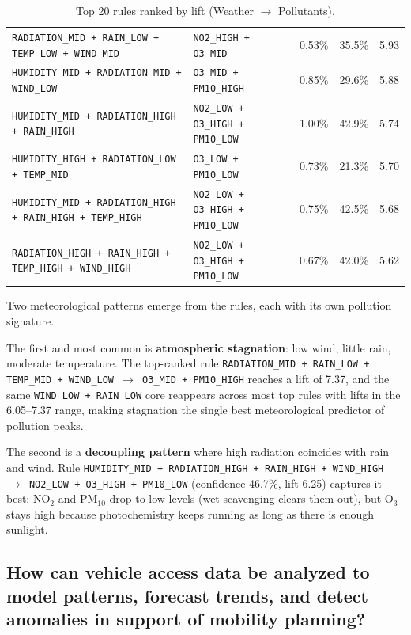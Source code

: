 \documentclass{article}
\begin{document}
\begin{table}[H]
{\begin{tabular}{llrrr}
			\texttt{RADIATION\_MID + RAIN\_LOW + TEMP\_LOW + WIND\_MID}& \texttt{NO2\_HIGH + O3\_MID}& 0.53\% & 35.5\% & 5.93 \\
			\texttt{HUMIDITY\_MID + RADIATION\_MID + WIND\_LOW}& \texttt{O3\_MID + PM10\_HIGH} & 0.85\% & 29.6\% & 5.88 \\
			\texttt{HUMIDITY\_MID + RADIATION\_HIGH + RAIN\_HIGH}& \texttt{NO2\_LOW + O3\_HIGH + PM10\_LOW}& 1.00\% & 42.9\% & 5.74 \\
			\texttt{HUMIDITY\_HIGH + RADIATION\_LOW + TEMP\_MID} & \texttt{O3\_LOW + PM10\_LOW}& 0.73\% & 21.3\% & 5.70 \\
			\texttt{HUMIDITY\_MID + RADIATION\_HIGH + RAIN\_HIGH + TEMP\_HIGH} & \texttt{NO2\_LOW + O3\_HIGH + PM10\_LOW}& 0.75\% & 42.5\% & 5.68 \\
			\texttt{RADIATION\_HIGH + RAIN\_HIGH + TEMP\_HIGH + WIND\_HIGH}& \texttt{NO2\_LOW + O3\_HIGH + PM10\_LOW}& 0.67\% & 42.0\% & 5.62 \\
			\hline
		\end{tabular}}
		\caption*{Top 20 rules ranked by lift (Weather $\rightarrow$ Pollutants).}
	\end{table}

	Two meteorological patterns emerge from the rules, each with its own pollution signature.

	The first and most common is \textbf{atmospheric stagnation}: low wind, little rain, moderate temperature. The top-ranked rule \texttt{RADIATION\_MID + RAIN\_LOW + TEMP\_MID + WIND\_LOW $\rightarrow$ O3\_MID + PM10\_HIGH} reaches a lift of 7.37, and the same \texttt{WIND\_LOW + RAIN\_LOW} core reappears across most top rules with lifts in the 6.05--7.37 range, making stagnation the single best meteorological predictor of pollution peaks.

	The second is a \textbf{decoupling pattern} where high radiation coincides with rain and wind. Rule \texttt{HUMIDITY\_MID + RADIATION\_HIGH + RAIN\_HIGH + WIND\_HIGH $\rightarrow$ NO2\_LOW + O3\_HIGH + PM10\_LOW} (confidence 46.7\%, lift 6.25) captures it best: NO$_2$ and PM$_{10}$ drop to low levels (wet scavenging clears them out), but O$_3$ stays high because photochemistry keeps running as long as there is enough sunlight.

	
	\newpage
	
	\subsection{How can vehicle access data be analyzed to model patterns, forecast trends, and detect anomalies in support of mobility planning?}
	
\end{document}
